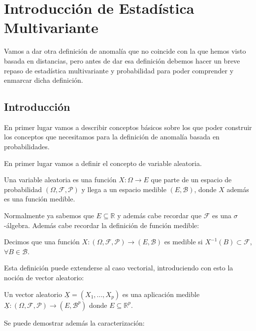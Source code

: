 \chapter{Introducción de Estadística Multivariante}
\label{chapter:estadistica_multivariante}

Vamos a dar otra definición de anomalía que no coincide con la que hemos visto basada en distancias, pero antes de dar esa definición debemos hacer un breve repaso de estadística multivariante y probabilidad para poder comprender y enmarcar dicha definición.

\section{Introducción}

En primer lugar vamos a describir conceptos básicos sobre los que poder construir los conceptos que necesitamos para la definición de anomalía basada en probabilidades.

En primer lugar vamos a definir el concepto de variable aleatoria.

\begin{definicion}
	Una variable aleatoria es una función $X:\Omega \rightarrow E$ que parte de un espacio de probabilidad $(\Omega , \mathcal{F}, \mathcal{P})$ y llega a un espacio medible $(E, \mathcal{B})$, donde $X$ además es una función medible.
\end{definicion}

Normalmente ya sabemos que $E\subseteq \mathbb{R}$ y además cabe recordar que $\mathcal{F}$ es una $\sigma$-álgebra. Además cabe recordar la definición de función medible:

\begin{definicion}
	Decimos que una función $X: (\Omega , \mathcal{F}, \mathcal{P}) \rightarrow (E, \mathcal{B})$ es medible si $X^{-1}(B)\subset \mathcal{F}$, $\forall B \in \mathcal{B}$.
\end{definicion}

Esta definición puede extenderse al caso vectorial, introduciendo con esto la noción de vector aleatorio:

\begin{definicion}
	Un vector aleatorio $\underline{X} = (X_1 , ... , X_p)$ es una aplicación medible $\underline{X}: (\Omega , \mathcal{F}, \mathcal{P})\rightarrow (E, \mathcal{B}^p)$ donde $E\subseteq \mathbb{R}^p$.
\end{definicion}

Se puede demostrar además la caracterización:

